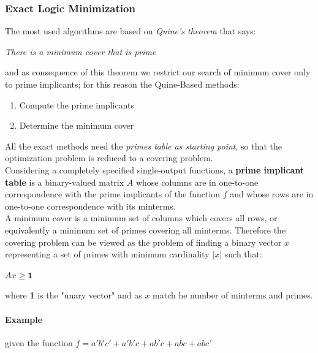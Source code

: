 \subsubsection{Exact Logic Minimization}
The most used algorithms are based on \textit{Quine's theorem} that says:
\begin{center}
	\textit{There is a minimum cover that is prime}\\
\end{center}
and as consequence of this theorem we restrict our search of minimum cover only to prime implicants; for this reason the Quine-Based methods:
\begin{enumerate}
	\item Compute the prime implicants
	\item Determine the minimum cover
\end{enumerate} 
All the exact methods need the\textit{ primes table as starting point}, so that the optimization problem is reduced to a covering problem.\\
Considering a completely specified single-output functions, a \textbf{prime implicant table} is a binary-valued matrix $A$ whose columns are in one-to-one correspondence with the prime implicants of the function $f$ and whose rows are in one-to-one correspondence with its minterms.\\ 
A minimum cover is a minimum set of columns which covers all rows, or equivalently a minimum set of primes covering all minterms. Therefore the covering problem can be viewed as the problem of finding a binary vector $x$ representing a set of primes with minimum cardinality $|x|$ such that:
\begin{center}
	$Ax \geqslant \textbf{1}$
\end{center}
where \textbf{1} is the "unary vector" and as $x$ match he number of minterms and primes.

\paragraph{Example} given the function $ f= a'b'c' + a'b'c + ab'c + abc + abc' $
\bigskip\\

